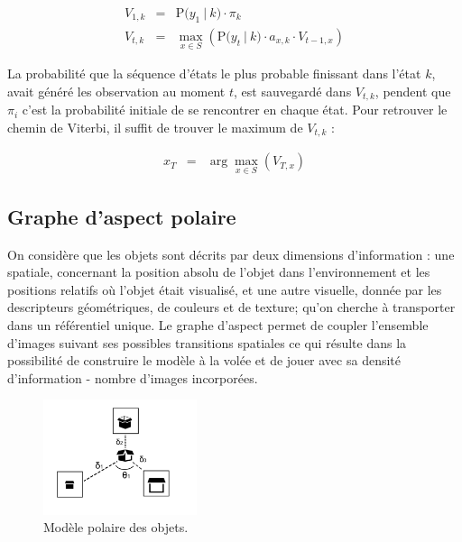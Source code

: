 \begin{equation*}
  \begin{array}{rcl}
    V_{1,k} &=& \mathrm{P}\big( y_1 \ | \ k \big) \cdot \pi_k \\
    V_{t,k} &=& \max_{x \in S} \left(  \mathrm{P}\big( y_t \ | \ k \big) \cdot a_{x,k} \cdot V_{t-1,x}\right)
  \end{array}
\end{equation*}

La probabilité que la séquence d'états le plus probable finissant dans l'état $k$, avait généré les observation au moment $t$, est sauvegardé dans $V_{t,k}$, pendent que $\pi_i$ c'est la probabilité initiale de se rencontrer en chaque état. Pour retrouver le chemin de Viterbi, il suffit de trouver le maximum de $V_{t,k}$ :

\begin{equation*}
  \begin{array}{rcl}
    x_T &=& \arg\max_{x \in S} (V_{T,x})
  \end{array}
\end{equation*}

\subsection {Graphe d'aspect polaire}

On considère que les objets sont décrits par deux dimensions
d'information : une spatiale, concernant la position absolu de l'objet
dans l'environnement et les positions relatifs où l'objet était
visualisé, et une autre visuelle, donnée par les descripteurs
géométriques, de couleurs et de texture; qu'on cherche à transporter
dans un référentiel unique. Le graphe d'aspect permet de coupler
l'ensemble d'images suivant ses possibles transitions spatiales ce qui
résulte dans la possibilité de construire le modèle à la volée et de
jouer avec sa densité d'information - nombre d'images incorporées.

\begin{figure}[H]
  \centering
  \includegraphics[width=0.4\textwidth]{object_model.png}
  \caption{Modèle polaire des objets.}
\end{figure}

